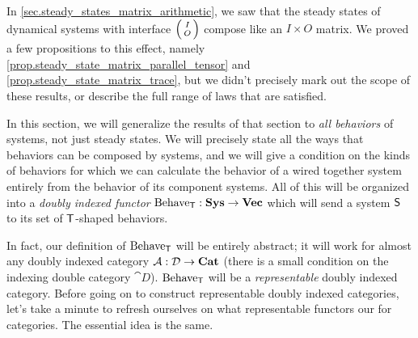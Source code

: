 \documentclass[DynamicalBook]{subfiles}
\begin{document}
In \cref{sec.steady_states_matrix_arithmetic}, we saw that the steady states of
dynamical systems with interface $\lens{I}{O}$ compose like an $I \times O$
matrix. We proved a few propositions to this effect, namely
\cref{prop.steady_state_matrix_parallel_tensor} and
\cref{prop.steady_state_matrix_trace}, but we didn't precisely mark out the
scope of these results, or describe the full range of laws that are satisfied.

In this section, we will generalize the results of that section to \emph{all
  behaviors} of systems, not just steady states. We will precisely state all the
ways that behaviors can be composed by systems, and we will give a condition on
the kinds of behaviors for which we can calculate the behavior of a wired
together system entirely from the behavior of its component systems. All of this will be organized into a \emph{doubly indexed functor}
$\mathrm{Behave}_{\mathsf{T}} : \textbf{Sys} \to \textbf{Vec}$
which will send a system $\mathsf{S}$ to its set of
$\mathsf{T}$-shaped behaviors. 

In fact, our definition of $\mathrm{Behave}_{\mathsf{T}}$ will be entirely abstract;
it will work for almost any doubly indexed category $\mathcal{A} : \mathcal{D} \to \textbf{Cat}$ (there is a small condition
on the indexing double category $\cat{D}$). $\mathrm{Behave}_{\mathsf{T}}$ will be a
\emph{representable} doubly indexed category. Before going on to construct
representable doubly indexed categories, let's take a minute to refresh
ourselves on what representable functors our for categories. The essential idea
is the same.
\end{document}
